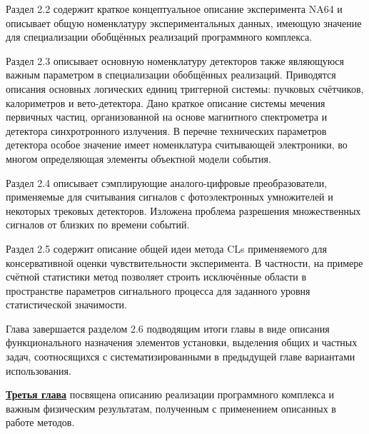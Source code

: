Раздел 2.2 содержит краткое концептуальное описание
эксперимента NA64 и описывает общую номенклатуру
экспериментальных данных, имеющую значение для специализации обобщённых
реализаций программного комплекса.

Раздел 2.3 описывает основную номенклатуру
детекторов также являющуюся важным параметром в специализации
обобщённых реализаций. Приводятся описания основных
логических единиц триггерной системы: пучковых
счётчиков, калориметров и вето-детектора. Дано
краткое описание системы мечения первичных частиц,
организованной на основе магнитного спектрометра
и детектора синхротронного излучения. В перечне технических
параметров детектора особое значение имеет номенклатура
считывающей электроники, во многом определяющая
элементы объектной модели события.

Раздел 2.4 описывает сэмплирующие аналого-цифровые
преобразователи, применяемые для считывания сигналов
с фотоэлектронных умножителей и некоторых трековых
детекторов. Изложена проблема разрешения множественных
сигналов от близких по времени событий.

Раздел 2.5 содержит описание общей идеи метода CLs применяемого
для консервативной оценки чувствительности эксперимента.
В частности, на примере счётной статистики метод позволяет
строить исключённые области в пространстве
параметров сигнального процесса для заданного уровня
статистической значимости.

Глава завершается разделом 2.6 подводящим итоги главы
в виде описания функционального назначения элементов установки,
выделения общих и частных задач, соотносящихся с
систематизированными в предыдущей главе вариантами использования.

\underline{\textbf{Третья глава}} посвящена описанию реализации
программного комплекса и важным физическим результатам,
полученным с применением описанных в работе методов.


